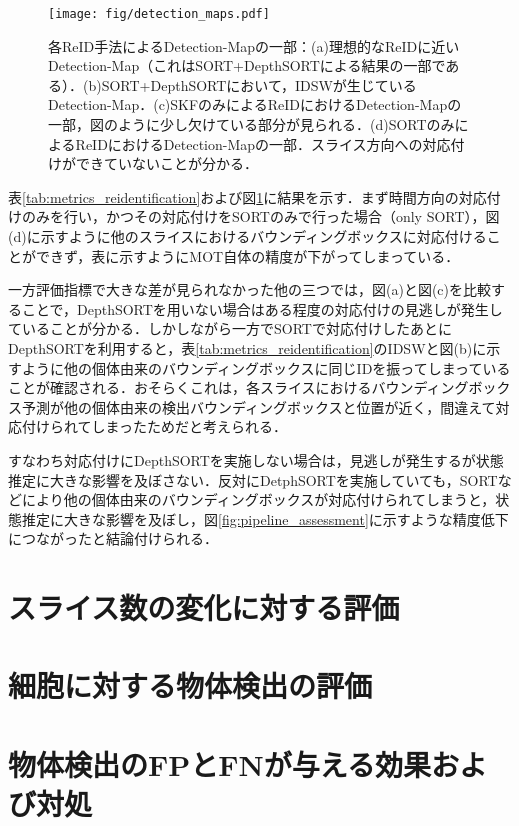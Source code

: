     \begin{figure}[t]
        \centering
        \texttt{[image: fig/detection\_maps.pdf]}
        \caption[各ReID手法によるDetection-Mapの一部]{各ReID手法によるDetection-Mapの一部：(a)理想的なReIDに近いDetection-Map（これはSORT+DepthSORTによる結果の一部である）．(b)SORT+DepthSORTにおいて，IDSWが生じているDetection-Map．(c)SKFのみによるReIDにおけるDetection-Mapの一部，図のように少し欠けている部分が見られる．(d)SORTのみによるReIDにおけるDetection-Mapの一部．スライス方向への対応付けができていないことが分かる．}
        \label{fig:detection_maps}
    \end{figure}

    表\ref{tab:metrics_reidentification}および図\ref{fig:detection_maps}に結果を示す．まず時間方向の対応付けのみを行い，かつその対応付けをSORTのみで行った場合（only SORT），図(d)に示すように他のスライスにおけるバウンディングボックスに対応付けることができず，表に示すようにMOT自体の精度が下がってしまっている．

    一方評価指標で大きな差が見られなかった他の三つでは，図(a)と図(c)を比較することで，DepthSORTを用いない場合はある程度の対応付けの見逃しが発生していることが分かる．しかしながら一方でSORTで対応付けしたあとにDepthSORTを利用すると，表\ref{tab:metrics_reidentification}のIDSWと図(b)に示すように他の個体由来のバウンディングボックスに同じIDを振ってしまっていることが確認される．おそらくこれは，各スライスにおけるバウンディングボックス予測が他の個体由来の検出バウンディングボックスと位置が近く，間違えて対応付けられてしまったためだと考えられる．

    すなわち対応付けにDepthSORTを実施しない場合は，見逃しが発生するが状態推定に大きな影響を及ぼさない．反対にDetphSORTを実施していても，SORTなどにより他の個体由来のバウンディングボックスが対応付けられてしまうと，状態推定に大きな影響を及ぼし，図\ref{fig:pipeline_assessment}に示すような精度低下につながったと結論付けられる．

\section{スライス数の変化に対する評価}
\label{sec:number_of_slice}

\section{細胞に対する物体検出の評価}
\label{sec:cell_detection}

\section{物体検出のFPとFNが与える効果および対処}
\label{sec:covering_detection}
